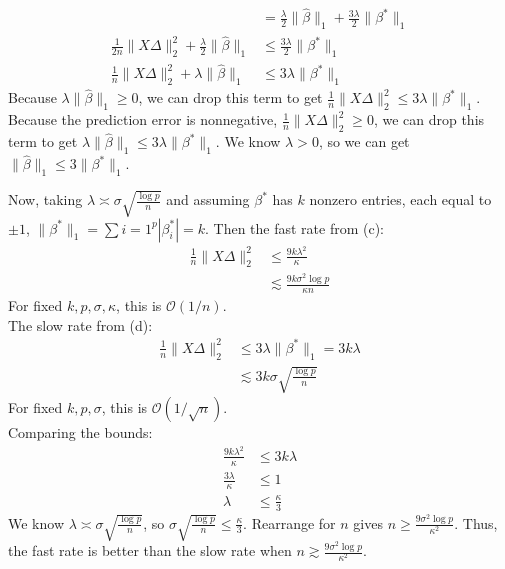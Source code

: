 \documentclass[11pt,a4paper,margin=1in]{article}
\begin{document}
\begin{enumerate}[(a)]
\begin{align*}
        &= \frac{\lambda}{2}\|\hat{\beta}\|_1 + \frac{3\lambda}{2}\|\beta^*\|_1 \\
        \frac{1}{2n}\|X\Delta\|_2^2 + \frac{\lambda}{2}\|\hat{\beta}\|_1 &\leq \frac{3\lambda}{2}\|\beta^*\|_1 \\
        \frac{1}{n}\|X\Delta\|_2^2 + \lambda\|\hat{\beta}\|_1 &\leq 3\lambda\|\beta^*\|_1
    \end{align*}
    Because $\lambda\|\hat{\beta}\|_1 \geq 0$, we can drop this term to get $\frac{1}{n}\|X\Delta\|_2^2 \leq 3\lambda\|\beta^*\|_1$.
    Because the prediction error is nonnegative, $\frac{1}{n}\|X\Delta\|_2^2 \geq 0$, 
    we can drop this term to get $\lambda\|\hat{\beta}\|_1 \leq 3\lambda\|\beta^*\|_1$.
    We know $\lambda > 0$, so we can get $\|\hat{\beta}\|_1 \leq 3\|\beta^*\|_1$.

    Now, taking $\lambda \asymp \sigma\sqrt{\frac{\log p}{n}}$ and assuming $\beta^*$
    has $k$ nonzero entries, each equal to $\pm1$, $\|\beta^*\|_1 = \sum{i=1}^p |\beta^*_i| = k$. 
    Then the fast rate from (c):
    \begin{align*}
        \frac{1}{n}\|X\Delta\|_2^2 &\leq \frac{9k\lambda^2}{\kappa} \\
        &\lesssim \frac{9k\sigma^2\log p}{\kappa n} 
    \end{align*}
    For fixed $k, p, \sigma, \kappa$, this is $\mathcal{O}(1/n)$. \\
    The slow rate from (d):
    \begin{align*}
            \frac{1}{n}\|X\Delta\|_2^2 &\leq 3\lambda\|\beta^*\|_1 = 3k\lambda\\
            &\lesssim 3k\sigma\sqrt{\frac{\log p}{n}}
    \end{align*}
    For fixed $k, p, \sigma$, this is $\mathcal{O}(1/\sqrt{n})$. \\
    Comparing the bounds:
    \begin{align*}
        \frac{9k\lambda^2}{\kappa} &\leq 3k\lambda \\
        \frac{3\lambda}{\kappa} &\leq 1 \\
        \lambda &\leq \frac{\kappa}{3}
    \end{align*}
    We know $\lambda \asymp \sigma\sqrt{\frac{\log p}{n}}$, so $\sigma\sqrt{\frac{\log p}{n}} \leq \frac{\kappa}{3}$.
    Rearrange for $n$ gives $n \geq \frac{9\sigma^2\log p}{\kappa^2}$. Thus, the fast rate 
    is better than the slow rate when $n \gtrsim \frac{9\sigma^2\log p}{\kappa^2}$.
\end{enumerate}
\end{document}

